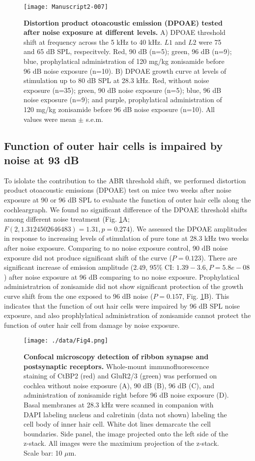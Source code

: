 \documentclass[11pt]{article}
\begin{document}
\begin{figure}[ht!]
\centering
\texttt{[image: Manuscript2-007]}
\caption{{\bf {Distortion product otoacoustic emission (DPOAE) tested after noise exposure at different levels.}} A) DPOAE threshold shift at frequency across the 5 kHz to 40 kHz. $L1$ and $L2$ were 75 and 65 dB SPL, respecitvely. Red, 90 dB (n=5); green, 96 dB (n=9); blue, prophylatical administration of 120 mg/kg zonisamide before 96 dB noise exposure (n=10). B) DPOAE growth curve at levels of stimulation up to 80 dB SPL at 28.3 kHz. Red, without noise exposure (n=35); green, 90 dB noise exposure (n=5); blue, 96 dB noise exposure (n=9); and purple, prophylatical administration of 120 mg/kg zonisamide before 96 dB noise exposure (n=10). All values were  mean $\pm$ s.e.m. }
\label{fig:Figure3}
\end{figure}

\subsection {Function of outer hair cells is impaired by noise at 93 dB}
To islolate the contribution to the ABR threshold shift, we performed distortion product otoacoustic emissions (DPOAE) test on mice two weeks after noise exposure at 90 or 96 dB SPL to evaluate the function of outer hair cells along the cochleargraph. We found no significant difference of the DPOAE threshold shifts among different noise treatment 
(Fig. \ref{fig:Figure3}A; $F(2,1.3124502646483)=1.31,
 p=0.274$). We assessed the DPOAE amplitudes in response to increasing levels of stimulation of pure tone at 28.3 kHz two weeks after noise exposure. Comparing to no noise exposure control, 90 dB noise exposure did not produce significant shift of the curve 
($P=0.123$). There are significant increase of emission amplitude ($2.49$, 95\% CI: $1.39 - 3.6, P= 5.8e-08$) after noise exposure at 96 dB comparing to no noise exposure. Prophylatical administratrion of zonisamide did not show significant protection of the growth curve shift from the one exposed to 96 dB noise ($P=0.157$, Fig. \ref{fig:Figure3}B).  
 This indicates that the function of out hair cells were impaired by 96 dB SPL noise exposure, and also prophlylatical administration of zonisamide cannot protect the function of outer hair cell from damage by noise exposure.

\begin{figure}[ht!]
\centering
\texttt{[image: ./data/Fig4.png]}
\caption{{\bf {Confocal microscopy detection of ribbon synapse and postsynaptic receptors.}}  Whole-mount immunofluorescence staining of CtBP2 (red) and GluR2/3 (green) was performed on cochlea without noise exposure (A), 90 dB (B), 96 dB (C), and administration of zonisamide right before 96 dB noise exposure (D). Basal membranes at 28.3 kHz were scanned in companion with DAPI labeling nucleus and calretinin (data not shown) labeling the cell body of inner hair cell. White dot lines demarcate the cell boundaries. Side panel, the image projected onto the left side of the z-stack. All images were the maximium projection of the z-stack. Scale bar: 10 $\mu$m. }
\label{fig:Figure4}
\end{figure}
\end{document}
